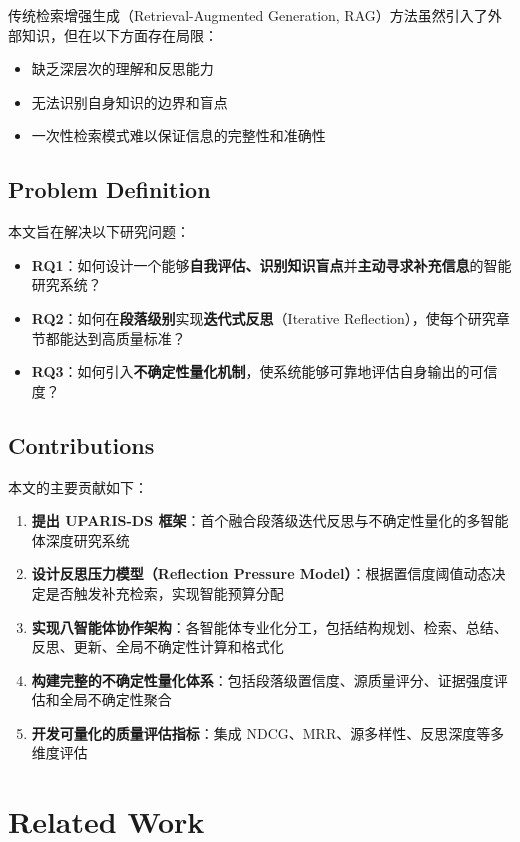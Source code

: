 \documentclass[12pt,a4paper]{article}
\begin{document}
传统检索增强生成（Retrieval-Augmented Generation, RAG）方法虽然引入了外部知识，但在以下方面存在局限：
\begin{itemize}
    \item 缺乏深层次的理解和反思能力
    \item 无法识别自身知识的边界和盲点
    \item 一次性检索模式难以保证信息的完整性和准确性
\end{itemize}

\subsection{Problem Definition}
本文旨在解决以下研究问题：

\begin{itemize}
    \item \textbf{RQ1}：如何设计一个能够\textbf{自我评估、识别知识盲点}并\textbf{主动寻求补充信息}的智能研究系统？
    \item \textbf{RQ2}：如何在\textbf{段落级别}实现\textbf{迭代式反思}（Iterative Reflection），使每个研究章节都能达到高质量标准？
    \item \textbf{RQ3}：如何引入\textbf{不确定性量化机制}，使系统能够可靠地评估自身输出的可信度？
\end{itemize}

\subsection{Contributions}
本文的主要贡献如下：

\begin{enumerate}
    \item \textbf{提出 UPARIS-DS 框架}：首个融合段落级迭代反思与不确定性量化的多智能体深度研究系统
    \item \textbf{设计反思压力模型（Reflection Pressure Model）}：根据置信度阈值动态决定是否触发补充检索，实现智能预算分配
    \item \textbf{实现八智能体协作架构}：各智能体专业化分工，包括结构规划、检索、总结、反思、更新、全局不确定性计算和格式化
    \item \textbf{构建完整的不确定性量化体系}：包括段落级置信度、源质量评分、证据强度评估和全局不确定性聚合
    \item \textbf{开发可量化的质量评估指标}：集成 NDCG、MRR、源多样性、反思深度等多维度评估
\end{enumerate}

\section{Related Work}
\end{document}
